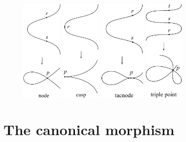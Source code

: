 \begin{figure}   %
\centerline{%
  \includegraphics[height=2in]{"main/Fig02-sing-node"}\hfil\quad
  \includegraphics[height=2in]{"main/Fig02-sing-cusp"}\hfil\quad
  \includegraphics[height=2in]{"main/Fig02-sing-tacnode"}\hfil\quad
  \includegraphics[height=2in]{"main/Fig02-sing-triple"}}
\end{figure}


\section{The canonical morphism}

